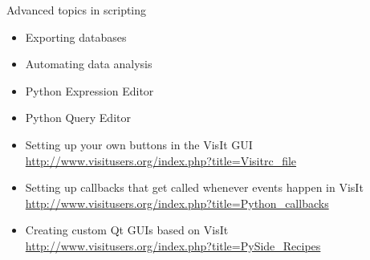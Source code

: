 \begin{frame}{Advanced topics in scripting}
  \begin{itemize}\setlength{\itemsep}{3mm}
  \item Exporting databases
  \item Automating data analysis
  \item Python Expression Editor
  \item Python Query Editor
  \item Setting up your own buttons in the VisIt GUI
        \url{http://www.visitusers.org/index.php?title=Visitrc_file}
  \item Setting up callbacks that get called whenever events happen in VisIt
        \url{http://www.visitusers.org/index.php?title=Python_callbacks}
  \item Creating custom Qt GUIs based on VisIt
        \url{http://www.visitusers.org/index.php?title=PySide_Recipes}
  \end{itemize}
\end{frame}
